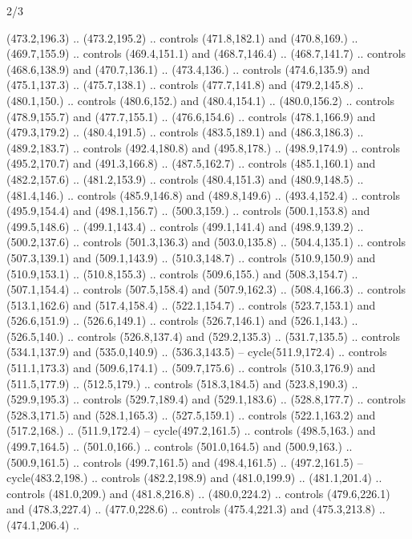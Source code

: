 \begin{flagdescription}{2/3}
\begin{scope}[xshift=0.5\flaglength,fill=white]
\begin{scope}[scale=0.00038\flagwidth,yshift=38.5mm,xshift=-705mm]
\begin{scope}[y=0.1mm, x=0.1mm, yscale=-1, xscale=1]
\begin{scope}[cm={{18.0964,0.0,0.0,17.21363,(246.63518,-8836.1551)}}]
  (473.2,196.3) .. (473.2,195.2) .. controls (471.8,182.1) and
  (470.8,169.) .. (469.7,155.9) .. controls (469.4,151.1) and
  (468.7,146.4) .. (468.7,141.7) .. controls (468.6,138.9) and
  (470.7,136.1) .. (473.4,136.) .. controls (474.6,135.9) and
  (475.1,137.3) .. (475.7,138.1) .. controls (477.7,141.8) and
  (479.2,145.8) .. (480.1,150.) .. controls (480.6,152.) and
  (480.4,154.1) .. (480.0,156.2) .. controls (478.9,155.7) and
  (477.7,155.1) .. (476.6,154.6) .. controls (478.1,166.9) and
  (479.3,179.2) .. (480.4,191.5) .. controls (483.5,189.1) and
  (486.3,186.3) .. (489.2,183.7) .. controls (492.4,180.8) and
  (495.8,178.) .. (498.9,174.9) .. controls (495.2,170.7) and
  (491.3,166.8) .. (487.5,162.7) .. controls (485.1,160.1) and
  (482.2,157.6) .. (481.2,153.9) .. controls (480.4,151.3) and
  (480.9,148.5) .. (481.4,146.) .. controls (485.9,146.8) and
  (489.8,149.6) .. (493.4,152.4) .. controls (495.9,154.4) and
  (498.1,156.7) .. (500.3,159.) .. controls (500.1,153.8) and
  (499.5,148.6) .. (499.1,143.4) .. controls (499.1,141.4) and
  (498.9,139.2) .. (500.2,137.6) .. controls (501.3,136.3) and
  (503.0,135.8) .. (504.4,135.1) .. controls (507.3,139.1) and
  (509.1,143.9) .. (510.3,148.7) .. controls (510.9,150.9) and
  (510.9,153.1) .. (510.8,155.3) .. controls (509.6,155.) and
  (508.3,154.7) .. (507.1,154.4) .. controls (507.5,158.4) and
  (507.9,162.3) .. (508.4,166.3) .. controls (513.1,162.6) and
  (517.4,158.4) .. (522.1,154.7) .. controls (523.7,153.1) and
  (526.6,151.9) .. (526.6,149.1) .. controls (526.7,146.1) and
  (526.1,143.) .. (526.5,140.) .. controls (526.8,137.4) and
  (529.2,135.3) .. (531.7,135.5) .. controls (534.1,137.9) and
  (535.0,140.9) .. (536.3,143.5) -- cycle(511.9,172.4) ..
  controls (511.1,173.3) and (509.6,174.1) .. (509.7,175.6) ..
  controls (510.3,176.9) and (511.5,177.9) .. (512.5,179.) ..
  controls (518.3,184.5) and (523.8,190.3) .. (529.9,195.3) ..
  controls (529.7,189.4) and (529.1,183.6) .. (528.8,177.7) ..
  controls (528.3,171.5) and (528.1,165.3) .. (527.5,159.1) ..
  controls (522.1,163.2) and (517.2,168.) .. (511.9,172.4) --
  cycle(497.2,161.5) .. controls (498.5,163.) and
  (499.7,164.5) .. (501.0,166.) .. controls (501.0,164.5) and
  (500.9,163.) .. (500.9,161.5) .. controls (499.7,161.5) and
  (498.4,161.5) .. (497.2,161.5) -- cycle(483.2,198.) ..
  controls (482.2,198.9) and (481.0,199.9) .. (481.1,201.4) ..
  controls (481.0,209.) and (481.8,216.8) .. (480.0,224.2) ..
  controls (479.6,226.1) and (478.3,227.4) .. (477.0,228.6) ..
  controls (475.4,221.3) and (475.3,213.8) .. (474.1,206.4) ..

\end{scope}
\end{scope}
\end{scope}
\end{scope}
\end{flagdescription}
